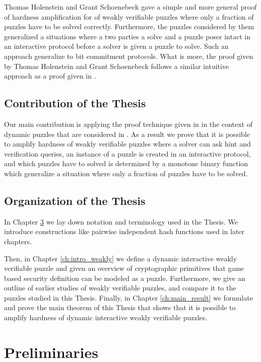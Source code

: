 \documentclass[11pt,a4paper,titlepage]{memoir}
\begin{document}
Thomas Holenstein and Grant Schoenebeck \cite{DBLP:journals/corr/abs-1002-3534} gave a simple and more general proof of hardness amplification for of weakly verifiable puzzles
where only a fraction of puzzles have to be solved correctly.
Furthermore, the puzzles considered by them generalized a situations where a two parties a solve and a puzzle poser intact in an interactive protocol before
a solver is given a puzzle to solve. Such an approach generalize to bit commitment protocols.
What is more, the proof given by Thomas Holenstein and Grant Schoenebeck follows a similar intuitive approach as a proof given in \cite{canetti2004hardness}.

\section{Contribution of the Thesis}
Our main contribution is applying the proof technique given in \cite{DBLP:journals/corr/abs-1002-3534}
in the context of dynamic puzzles that are considered in \cite{Dodis:2009:SAI:1530441.1530450}.
As a result we prove that it is possible to amplify hardness of weakly verifiable puzzles where a solver
can ask hint and verification queries, an instance of a puzzle is created in an interactive protocol, and
which puzzles have to solved is determined by a monotone binary function which generalize a situation where only
a fraction of puzzles have to be solved.

\section{Organization of the Thesis}
In Chapter \ref{ch:preliminaries} we lay down notation and terminology used in the Thesis.
We introduce constructions like pairwise independent hash functions used in later chapters.

Then, in Chapter \ref{ch:intro_weakly} we define a dynamic interactive weakly verifiable puzzle and
given an overview of cryptographic primitives that game based security definition can be modeled as
a puzzle. Furthermore, we give an outline of earlier studies of weakly verifiable puzzles, and
compare it to the puzzles studied in this Thesis.
Finally, in Chapter \ref{ch:main_result} we formulate and prove the main theorem of this Thesis that
shows that it is possible to amplify hardness of dynamic interactive weakly verifiable puzzles.

\chapter{Preliminaries}
\label{ch:preliminaries}

\end{document}
